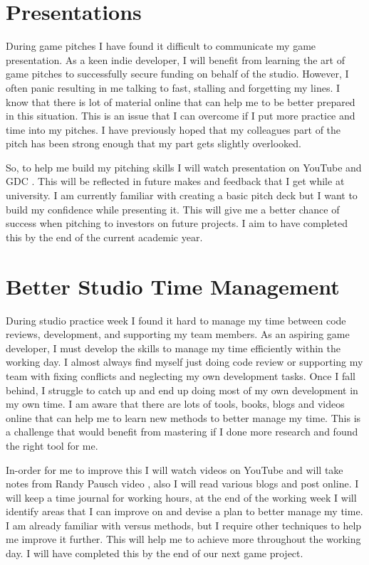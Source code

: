\documentclass{scrartcl}
\begin{document}
\section{Presentations}

During game pitches I have found it difficult to communicate my game presentation. As a keen indie developer, I will benefit from learning the art of game pitches to successfully secure funding on behalf of the studio. However, I often panic resulting in me talking to fast, stalling and forgetting my lines. I know that there is lot of material online that can help me to be better prepared in this situation. This is an issue that I can overcome if I put more practice and time into my pitches. I have previously hoped that my colleagues part of the pitch has been strong enough that my part gets slightly overlooked.

So, to help me build my pitching skills I will watch presentation on YouTube \cite{youTube} and GDC \cite{gdc}. This will be reflected in future makes and feedback that I get while at university. I am currently familiar with creating a basic pitch deck but I want to build my confidence while presenting it. This will give me a better chance of success when pitching to investors on future projects. I aim to have completed this by the end of the current academic year.


\section{Better Studio Time Management}

During studio practice week I found it hard to manage my time between code reviews, development, and supporting my team members.  As an aspiring game developer, I must develop the skills to manage my time efficiently within the working day. I almost always find myself just doing code review or supporting my team with fixing conflicts and neglecting my own development tasks. Once I fall behind, I struggle to catch up and end up doing most of my own development in my own time. I am aware that there are lots of tools, books, blogs and videos online that can help me to learn new methods to better manage my time. This is a challenge that would benefit from mastering if I done more research and found the right tool for me.

In-order for me to improve this I will watch videos on YouTube and will take notes from Randy Pausch video \cite{randy}, also I will read various blogs and post online. I will keep a time journal for working hours, at the end of the working week I will identify areas that I can improve on and devise a plan to better manage my time. I am already familiar with versus methods, but I require other techniques to help me improve it further. This will help me to achieve more throughout the working day. I will have completed this by the end of our next game project.  
\end{document}
